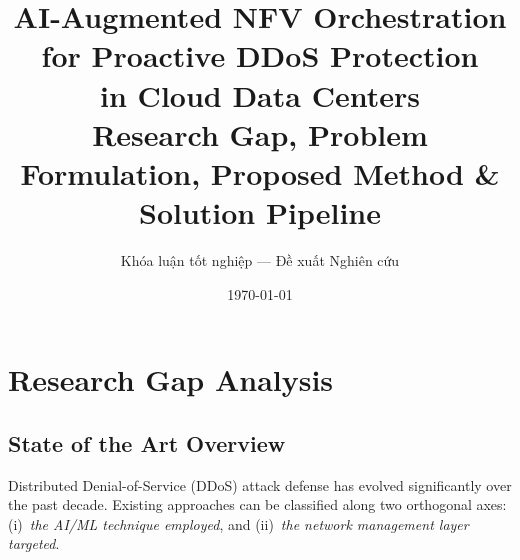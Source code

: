 \documentclass[12pt, a4paper]{article}
\title{
  \vspace{-1cm}
  \textbf{\Large AI-Augmented NFV Orchestration for Proactive DDoS Protection\\
  in Cloud Data Centers}\\[0.5em]
  \large Research Gap, Problem Formulation, Proposed Method \& Solution Pipeline
}
\author{
  \normalsize Khóa luận tốt nghiệp --- Đề xuất Nghiên cứu
}
\date{\today}
\begin{document}
\maketitle
\thispagestyle{fancy}
\tableofcontents
\newpage

\section{Research Gap Analysis}

\subsection{State of the Art Overview}

Distributed Denial-of-Service (DDoS) attack defense has evolved significantly
over the past decade. Existing approaches can be classified along two orthogonal
axes: (i)~\textit{the AI/ML technique employed}, and (ii)~\textit{the network
management layer targeted}.
\end{document}
